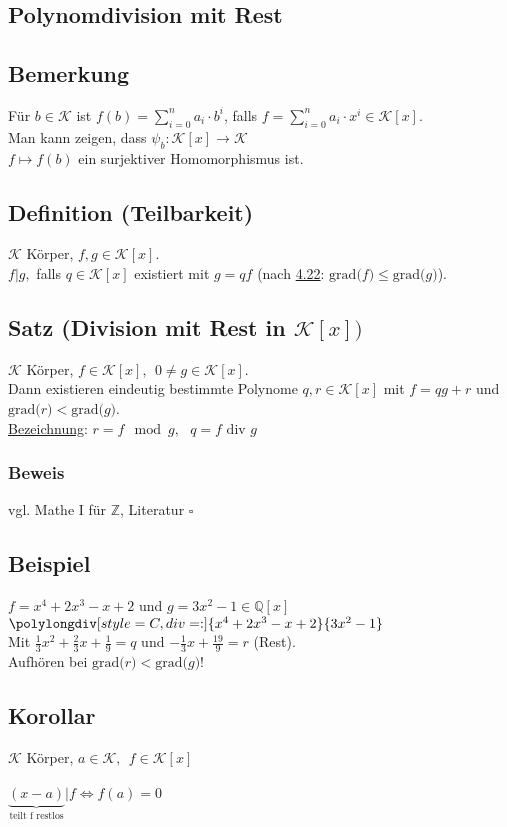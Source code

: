 \documentclass[a4paper, 12pt,titlepage, pdf, headsepline]{article}
\newcommand{\grad}[1]{\textrm{grad(}#1\textrm{)}}
\newcommand{\K}{\mathcal{K}}
\newcommand{\uline}[1]{\underline{#1}}
\newcommand{\qed}{\hfill$\square$}
\renewcommand{\>}{\rightarrow}
\renewcommand{\*}{\cdot}
\begin{document}
		      	\subsection*{Polynomdivision mit Rest}
		      	\subsection{Bemerkung}
		      	Für $b \in \K$ ist $f(b) = \sum_{i = 0}^{n} a_i \cdot b^i$, falls $f = \sum_{i = 0}^{n} a_i \cdot x^i \in \K[x]$.\\
		      	Man kann zeigen, dass $\psi_b : \K[x] \rightarrow \K$\\
		      	\noindent\hspace*{52mm}$ f \mapsto f(b)$ ein surjektiver Homomorphismus ist.
		      	\subsection{Definition (Teilbarkeit)}
		      	$\K$ Körper, $f,g \in \K[x].$\\$ f \vert g,$ falls $q \in \K[x]$ existiert mit $g = qf$ (nach \hyperref[4.22]{4.22}: $\grad{f}\leq\grad{g}$).
		      	\subsection{Satz (Division mit Rest in $\K[x])$}
		      	$\K$ Körper, $f \in \K[x], ~~0 \neq g \in \K[x]$.\\
		      	Dann existieren eindeutig bestimmte Polynome $q,r \in \K[x]$ mit $f = qg + r$ und $\grad{r}<\grad{g}$.\\
		      	\uline{Bezeichnung}: $r = f \mod g,~~~ q = f \text{ div } g$
		      	\subsubsection*{Beweis}
		      	vgl. Mathe I für $\mathds{Z}$, Literatur \qed
		      	\subsection{Beispiel}
		      	$f = x^4 + 2x^3 - x +2$ und $ g = 3x^2-1 \in \mathds{Q}[x]$\\
		      	$\polylongdiv[style=C, div=:]{x^4+2x^3-x+2}{3x^2-1}$\\
		      	Mit $\frac{1}{3}x^2+\frac{2}{3}x+\frac{1}{9}=q$ und $-\frac{1}{3}x+\frac{19}{9}=r$ (Rest).\\
		      	Aufhören bei $\grad{r}<\grad{g}$!
		      	\subsection{Korollar}
		      	$\K$ Körper, $a \in \K,~~ f \in \K[x]$\\
		      	\\
		      	$\underbrace{(x -a)}_{\textrm{teilt f restlos}}\vert f \Leftrightarrow f(a) = 0$
\end{document}
